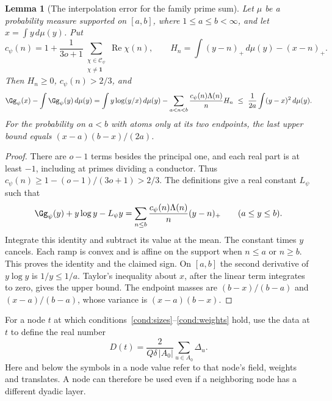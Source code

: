 \documentclass[a4paper,11pt]{article}
\newtheorem{lemma}[proposition]{Lemma}
\theoremstyle{definition}
\theoremstyle{remark}
\newcommand{\real}{\operatorname{Re}}\newcommand{\imag}{\operatorname{Im}}
\numberwithin{equation}{section}
\begin{document}
\begin{lemma}[The interpolation error for the family prime sum]
\leavevmode\label{lem:convexcount666}
Let \(\mu\) be a probability measure supported on \([a,b]\), where
\(1\le a\le b<\infty\), and let \(x=\int y\,d\mu(y)\). Put
\[
 c_\psi(n)=1+\frac{1}{3o+1}
             \sum_{\substack{\chi\in\mathcal C_\psi\\\chi\ne\mathbf1}}
                    \real\chi(n),\qquad
 H_n=\int (y-n)_+\,d\mu(y)-(x-n)_+ .
\]
Then \(H_n\ge0\), \(c_\psi(n)>2/3\), and
\[
 \Gg_\psi(x)-\int\Gg_\psi(y)\,d\mu(y)
  =\int y\log(y/x)\,d\mu(y)
    -\sum_{a<n<b}\frac{c_\psi(n)\Lambda(n)}{n}H_n
  \ \le\ \frac{1}{2a}\int(y-x)^2\,d\mu(y).
\]
For the probability on \(a<b\) with atoms only at its two endpoints,
the last upper bound equals \((x-a)(b-x)/(2a)\).
\end{lemma}
\begin{proof}
There are \(o-1\) terms besides the principal one, and each real
part is at least \(-1\), including at primes dividing a conductor.
Thus \(c_\psi(n)\ge 1-(o-1)/(3o+1)>2/3\).
The definitions give a real constant \(L_\psi\) such that
\[
 \Gg_\psi(y)+y\log y-L_\psi y
   =\sum_{n\le b}\frac{c_\psi(n)\Lambda(n)}{n}(y-n)_+
       \qquad (a\le y\le b).
\]
Integrate this identity and subtract its value at the mean.
The constant times \(y\) cancels. Each ramp is convex and is
affine on the support when \(n\le a\) or \(n\ge b\). This proves
the identity and the claimed sign. On \([a,b]\) the second
derivative of \(y\log y\) is \(1/y\le1/a\). Taylor's inequality
about \(x\), after the linear term integrates to zero, gives
the upper bound. The endpoint masses are \((b-x)/(b-a)\) and
\((x-a)/(b-a)\), whose variance is \((x-a)(b-x)\).
\end{proof}

For a node \(t\) at which conditions~\ref{cond:sizes}--\ref{cond:weights}
hold, use the data at \(t\) to define the real number
\[
 D(t)=\frac{2}{Q\delta\,|A_0|}\sum_{u\in A_0}\Delta_u .
\]
Here and below the symbols in a node value refer to that node's
field, weights and translates. A node can therefore be used even
if a neighboring node has a different dyadic layer.
\end{document}

